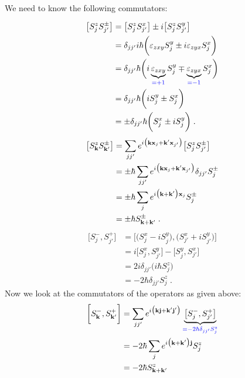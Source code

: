 We need to know the following commutators:

%
\begin{align*}
\big[S_{j}^{z} S^{\pm}_{j'}\big] &=\big[S_{j}^{z} S^{x}_{j'}\big] \pm i
\big[S_{j}^{z} S^{y}_{j'}\big]\\
&=\delta_{jj'}
i \hbar \bigg( \varepsilon_{z x y} S^{y}_{j} 
\pm i \varepsilon_{z y x} S^{x}_{j} \bigg)\\
&=\delta_{jj'}
 \hbar \bigg(i \underbrace{
\varepsilon_{z x y}
}_{\color{blue} = +1} S^{y}_{j}
\mp  \underbrace{
\varepsilon_{z y x}
}_{\color{blue} = -1} S^{x}_{j}
\bigg)\\
&= \delta_{jj'} \hbar \bigg(i S^{y}_{j} \pm  S^{x}_{j}\bigg)\\
&=\pm \delta_{jj'} \hbar \bigg(S^{x}_{j} \pm i S^{y}_{j}   \bigg)\;.
\end{align*}
%
%
\begin{align*}
\big[S_{\mathbf k}^{z} S^{\pm}_{\mathbf k'}\big] 
&=
\sum_{jj'}e^{i\big(\mathbf k \mathbf x_{j} + \mathbf k' \mathbf x_{j'}\big)}
\big[S_{j}^{z} S^{\pm}_{ j'}\big] 
\\
&=\pm \hbar 
\sum_{jj'}e^{i\big(\mathbf k \mathbf x_{j} + \mathbf k' \mathbf x_{j'}\big)}
\delta_{jj'} S^{\pm}_{j}\\
&=\pm  \hbar 
\sum_{j}e^{i\big(\mathbf k + \mathbf k' \big)\mathbf x_{j}} S^{\pm}_{j}\\
&=\pm  \hbar S^{\pm}_{\mathbf k+\mathbf k'}\;.
\end{align*}
%
%
\begin{align*}
\big[S^{-}_{j},S^{+}_{j'}\big] 
&=\big[\big(S^{x}_{j}- iS ^{y}_{j}\big),\big(S^{x}_{j'}+ i S^{y}_{j'}\big)\big] \\
&=i \big[S^{x}_{j},S^{y}_{j'}\big]
 -  \big[S^{y}_{j},S^{x}_{j'}\big]\\
&= 2 i  \delta_{jj'} \big(i \hbar S_{j}^{z}\big)\\
&= - 2  \hbar \delta_{jj'}  S_{j}^{z}\;.
\end{align*}
%
%
Now we look at the commutators of the operators as given above:
\begin{align*}
\bigg[S^{-}_{\mathbf k},S^{+}_{\mathbf k'}\bigg] &= \sum_{jj'}
e^{i\big(\mathbf k \vb{j}+\mathbf k' \vb{j'}\big)}
\underbrace{
\big[S^{-}_{j},S^{+}_{j'}\big]
}_{\color{blue} = - 2\hbar \delta_{jj'}S^{z}_{j}}\\
&= -2 \hbar \sum_{j}
e^{i\big(\mathbf k+\mathbf k' \big)\vb{j}}
S^{z}_{j}\\
&= -2 \hbar S^{z}_{\mathbf k +\mathbf k'}\
\end{align*}
%

